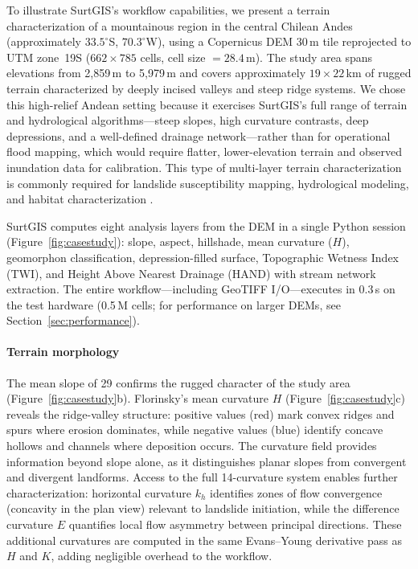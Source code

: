 \documentclass[preprint,review,12pt,authoryear]{elsarticle}
\begin{document}
To illustrate SurtGIS's workflow capabilities, we present a terrain characterization of a mountainous region in the central Chilean Andes (approximately $33.5^{\circ}$S, $70.3^{\circ}$W), using a Copernicus DEM 30\,m tile reprojected to UTM zone~19S ($662 \times 785$ cells, cell size $= 28.4$\,m). The study area spans elevations from 2{,}859\,m to 5{,}979\,m and covers approximately $19 \times 22$\,km of rugged terrain characterized by deeply incised valleys and steep ridge systems. We chose this high-relief Andean setting because it exercises SurtGIS's full range of terrain and hydrological algorithms---steep slopes, high curvature contrasts, deep depressions, and a well-defined drainage network---rather than for operational flood mapping, which would require flatter, lower-elevation terrain and observed inundation data for calibration. This type of multi-layer terrain characterization is commonly required for landslide susceptibility mapping, hydrological modeling, and habitat characterization \citep{amatulli2018}.

SurtGIS computes eight analysis layers from the DEM in a single Python session (Figure~\ref{fig:casestudy}): slope, aspect, hillshade, mean curvature ($H$), geomorphon classification, depression-filled surface, Topographic Wetness Index (TWI), and Height Above Nearest Drainage (HAND) with stream network extraction. The entire workflow---including GeoTIFF I/O---executes in 0.3\,s on the test hardware (0.5\,M cells; for performance on larger DEMs, see Section~\ref{sec:performance}).

\paragraph{Terrain morphology} The mean slope of 29\textdegree{} confirms the rugged character of the study area (Figure~\ref{fig:casestudy}b). Florinsky's mean curvature $H$ (Figure~\ref{fig:casestudy}c) reveals the ridge-valley structure: positive values (red) mark convex ridges and spurs where erosion dominates, while negative values (blue) identify concave hollows and channels where deposition occurs. The curvature field provides information beyond slope alone, as it distinguishes planar slopes from convergent and divergent landforms. Access to the full 14-curvature system enables further characterization: horizontal curvature $k_h$ identifies zones of flow convergence (concavity in the plan view) relevant to landslide initiation, while the difference curvature $E$ quantifies local flow asymmetry between principal directions. These additional curvatures are computed in the same Evans--Young derivative pass as $H$ and $K$, adding negligible overhead to the workflow.
\end{document}
